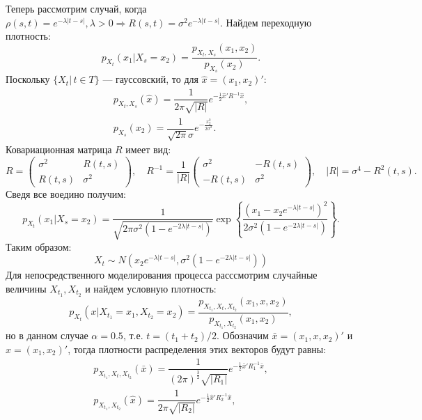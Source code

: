 \documentclass[oneside, final, 12pt]{article}
\begin{document}
	Теперь рассмотрим случай, когда $\rho(s,t)=e^{-\lambda|t-s|}, \lambda>0 \Rightarrow 
		R(s,t) = \sigma^2e^{-\lambda|t-s|}.$ 
	\newline
	Найдем переходную плотность:
	$$
		p_{X_t}(x_1|X_s =x_2) = \dfrac{p_{X_t,X_s}(x_1, x_2)}	
															{p_{X_s}(x_2)}.
	$$
	Поскольку $\{X_t|\,t\in T\}$ --- гауссовский, то для $\hat x=(x_1,x_2)'$:
	$$
		\begin{gathered}
			p_{X_{t},X_{s}}(\hat{x}) = \dfrac{1}{2\pi \sqrt{|R|}} 
																	 e^{-\frac{1}{2}\hat{x}'R^{-1}\hat{x}}, \\
			p_{X_{s}}(x_2) = \dfrac{1}{\sqrt{2\pi} \sigma} 
																	 e^{-\frac{x_2^2}{2\sigma^2}}.											  
		\end{gathered}
	$$
	Ковариационная матрица $R$ имеет вид:
	$$
		R =  \begin{pmatrix} \sigma^2 & R(t,s) \\
											  R(t,s) & \sigma^2
				\end{pmatrix}, \quad 
		R^{-1} = \dfrac{1}{|R|} \begin{pmatrix} \sigma^2 & -R(t,s) \\
										 									-R(t,s) & \sigma^2
												\end{pmatrix}, \quad 
		|R| = \sigma^4 - R^2(t,s).										
	$$
	Сведя все воедино получим:
	$$
		p_{X_t}(x_1|X_s =x_2)  = \dfrac{1}{ \sqrt{ 2\pi \sigma^2 (1-e^{-2\lambda|t-s|}) }}
													\exp \left\{ \dfrac{\left( x_1 - x_2 e^{-\lambda|t-s|} \right)^2}
																				{2\sigma^2 (1-e^{-2\lambda|t-s|}) }
															\right \}.
	$$
	Таким образом: 
	$$
		X_t \sim N(x_2 e^{-\lambda|t-s|}, \sigma^2 (1-e^{-2\lambda|t-s|}) ) 
	$$
	\newpage
	Для непосредственного моделирования процесса расссмотрим случайные величины $X_{t_1},X_{t_2}$ 
	и найдем условную плотность:
	$$
		p_{X_t}(x|X_{t_1} = x_1, X_{t_2} = x_2) = \dfrac{p_{X_{t_1},X_t,X_{t_2}}(x_1, x, x_2)}
																						{p_{X_{t_1},X_{t_2}}(x_1, x_2)},
	$$
	но в данном случае $\alpha = 0.5$, т.е. $t=(t_1+t_2)\slash 2.$
	\newline
	Обозначим $\bar{x} = (x_1,x, x_2)'$ и $\hat{x} = (x_1,x_2)'$, тогда плотности распределения этих векторов 
	будут равны:
	$$
		\begin{gathered}
			p_{X_{t_1},X_t,X_{t_2}}(\bar{x}) = \dfrac{1}{(2\pi)^{\frac{3}{2}} \sqrt{|R_1|}} 
																			e^{-\frac{1}{2}\bar{x}'R_1^{-1}\bar{x}},	 \\ 		
			p_{X_{t_1},X_{t_2}}(\hat{x}) = \dfrac{1}{2\pi \sqrt{|R_2|}} 
																			e^{-\frac{1}{2}\hat{x}'R_2^{-1}\hat{x}},				
		\end{gathered}
	$$
\end{document}
